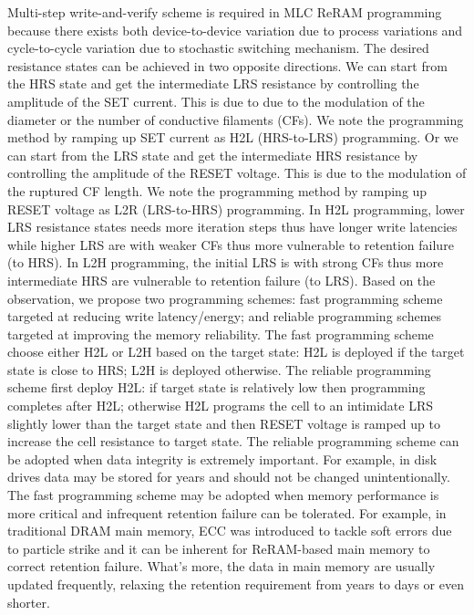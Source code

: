 Multi-step write-and-verify scheme is required in MLC ReRAM programming because there exists both device-to-device variation due to process variations and cycle-to-cycle variation due to stochastic switching mechanism. The desired resistance states can be achieved in two opposite directions. We can start from the HRS state and get the intermediate LRS resistance by controlling the amplitude of the SET current. This is due to due to the modulation of the diameter or the number of conductive filaments (CFs). We note the programming method by ramping up SET current as H2L (HRS-to-LRS) programming. Or we can start from the LRS state and get the intermediate HRS resistance by controlling the amplitude of the RESET voltage. This is due to the modulation of the ruptured CF length. We note the programming method by ramping up RESET voltage as L2R (LRS-to-HRS) programming. In H2L programming, lower LRS resistance states needs more iteration steps thus have longer write latencies while higher LRS are with weaker CFs thus more vulnerable to retention failure (to HRS). In L2H programming, the initial LRS is with strong CFs thus more intermediate HRS are vulnerable to retention failure (to LRS). Based on the observation, we propose two programming schemes: fast programming scheme targeted at reducing write latency/energy; and reliable programming schemes targeted at improving the memory reliability. The fast programming scheme choose either H2L or L2H based on the target state: H2L is deployed if the target state is close to HRS; L2H is deployed otherwise. The reliable programming scheme first deploy H2L: if target state is relatively low then programming completes after H2L; otherwise H2L programs the cell to an intimidate LRS slightly lower than the target state and then RESET voltage is ramped up to increase the cell resistance to target state. The reliable programming scheme can be adopted when data integrity is extremely important. For example, in disk drives data may be stored for years and should not be changed unintentionally. The fast programming scheme may be adopted when memory performance is more critical and infrequent retention failure can be tolerated. For example, in traditional DRAM main memory, ECC was introduced to tackle soft errors due to particle strike and it can be inherent for ReRAM-based main memory to correct retention failure. What's more, the data in main memory are usually updated frequently, relaxing the retention requirement from years to days or even shorter.




